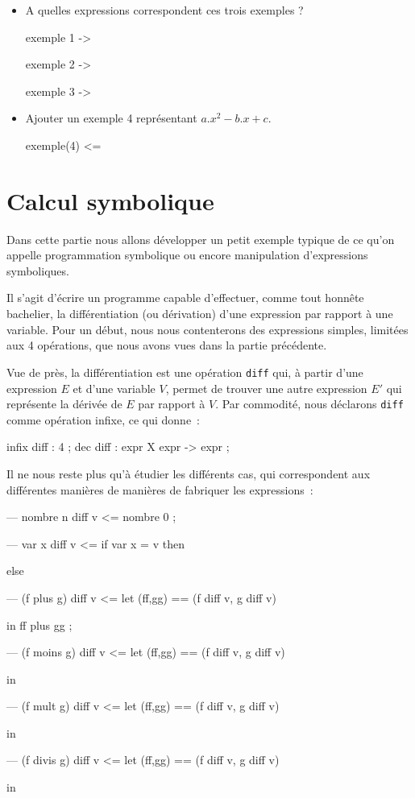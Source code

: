 \begin{exercice}

\begin{itemize}
\item  A quelles expressions correspondent ces trois exemples ?
\begin{verbatimtab}
exemple 1 -> 

exemple 2 ->

exemple 3 ->
\end{verbatimtab}
\item Ajouter un exemple 4 représentant $a.x^2 - b.x + c$.
\begin{verbatimtab}
exemple(4) <= 
\end{verbatimtab}
\end{itemize}
\end{exercice}
\section{Calcul symbolique}

Dans cette partie nous allons développer un petit exemple typique de ce qu'on appelle programmation symbolique  ou encore manipulation d'expressions symboliques.

Il s'agit d'écrire un programme capable d'effectuer, comme tout
honn\^ete bachelier, la différentiation (ou dérivation) d'une
expression par rapport à une variable. Pour un début, nous
nous contenterons des expressions simples, limitées aux 4 opérations,
que nous avons vues dans la partie précédente.

Vue de près, la différentiation est une opération \texttt{diff} qui, à partir
d'une expression $E$ et d'une variable $V$, permet de trouver une autre
expression $E'$ qui représente la dérivée de $E$ par rapport à $V$. Par
commodité, nous déclarons \texttt{diff} comme opération infixe, ce qui donne~:
\begin{verbatimtab}
infix diff : 4 ;
dec diff : expr X expr -> expr ;
\end{verbatimtab}
Il ne nous reste plus qu'à étudier les différents cas, qui
correspondent aux différentes manières de manières de fabriquer les
expressions~:
\begin{verbatimtab}
--- nombre n     	diff  v       <= nombre 0 ;

--- var x        	diff  v       <= if var x = v
					then 

					else

--- (f plus g)	diff v	<= let (ff,gg) == (f diff v, g diff v)

				in ff plus gg ;

--- (f moins g)	diff v	<= let (ff,gg) == (f diff v, g diff v)
                                  
				in

--- (f mult g)	diff v	<= let (ff,gg) == (f diff v, g diff v)

				in

--- (f divis g)	diff v	<= let (ff,gg) == (f diff v, g diff v)
                                  
				in 
\end{verbatimtab}

